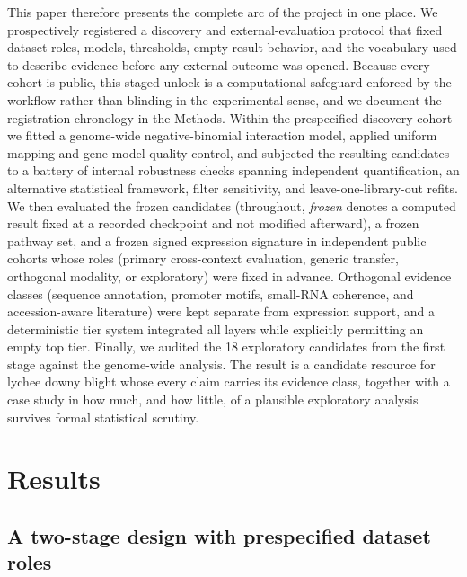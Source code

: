 \documentclass[11pt]{article}
\begin{document}
This paper therefore presents the complete arc of the project in one place. We prospectively registered a discovery and external-evaluation protocol that fixed dataset roles, models, thresholds, empty-result behavior, and the vocabulary used to describe evidence before any external outcome was opened. Because every cohort is public, this staged unlock is a computational safeguard enforced by the workflow rather than blinding in the experimental sense, and we document the registration chronology in the Methods. Within the prespecified discovery cohort we fitted a genome-wide negative-binomial interaction model, applied uniform mapping and gene-model quality control, and subjected the resulting candidates to a battery of internal robustness checks spanning independent quantification, an alternative statistical framework, filter sensitivity, and leave-one-library-out refits. We then evaluated the frozen candidates (throughout, \emph{frozen} denotes a computed result fixed at a recorded checkpoint and not modified afterward), a frozen pathway set, and a frozen signed expression signature in independent public cohorts whose roles (primary cross-context evaluation, generic transfer, orthogonal modality, or exploratory) were fixed in advance. Orthogonal evidence classes (sequence annotation, promoter motifs, small-RNA coherence, and accession-aware literature) were kept separate from expression support, and a deterministic tier system integrated all layers while explicitly permitting an empty top tier. Finally, we audited the 18 exploratory candidates from the first stage against the genome-wide analysis. The result is a candidate resource for lychee downy blight whose every claim carries its evidence class, together with a case study in how much, and how little, of a plausible exploratory analysis survives formal statistical scrutiny.

\section{Results}

\subsection{A two-stage design with prespecified dataset roles}
\end{document}
